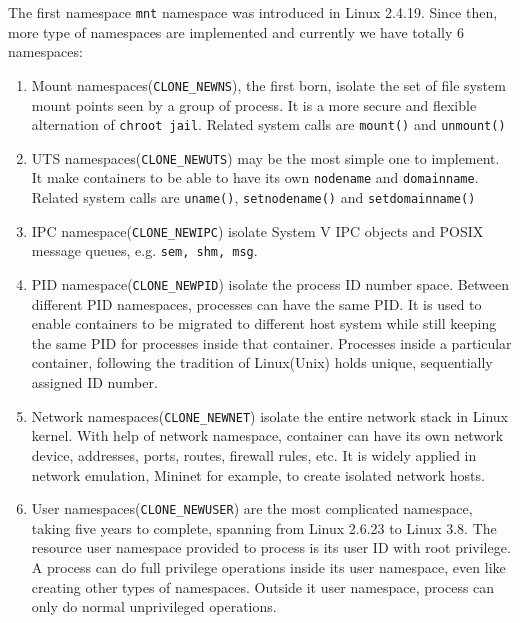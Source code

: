 \documentclass{acm_proc_article-sp}
\begin{document}
The first namespace \texttt{mnt} namespace was introduced in Linux 2.4.19. 
Since then, more type of namespaces are implemented and currently we have totally 6 namespaces:
\begin{enumerate}
\item Mount namespaces(\texttt{CLONE\_NEWNS}), the first born, isolate the set of file system mount points seen by a group of process\cite{lwn:namespace:overview}. It is a more secure and flexible alternation of \texttt{chroot jail}. Related system calls are \texttt{mount()} and \texttt{unmount()}

\item UTS namespaces(\texttt{CLONE\_NEWUTS}) may be the most simple one to implement. It make containers to be able to have its own \texttt{nodename} and \texttt{domainname}\cite{lwn:namespace:overview}. Related system calls are \texttt{uname()}, \texttt{setnodename()} and \texttt{setdomainname()} 

\item IPC namespace(\texttt{CLONE\_NEWIPC}) isolate System V IPC objects and POSIX message queues, e.g. \texttt{sem, shm, msg}. 

\item PID namespace(\texttt{CLONE\_NEWPID}) isolate the process ID number space. Between different PID namespaces, processes can have the same PID. 
It is used to enable containers to be migrated to different host system while still keeping the same PID for processes inside that container. 
Processes inside a particular container, following the tradition of Linux(Unix) holds unique, sequentially assigned ID number.\cite{lwn:namespace:pid}

\item Network namespaces(\texttt{CLONE\_NEWNET}) isolate the entire network stack in Linux kernel. With help of network namespace, container can have its own network device, addresses, ports, routes, firewall rules, etc\cite{lwn:namespace:net}. 
It is widely applied in network emulation, Mininet\cite{mininet} for example, to create isolated network hosts.

\item User namespaces(\texttt{CLONE\_NEWUSER}) are the most complicated namespace, taking five years to complete, spanning from Linux 2.6.23 to Linux 3.8\cite{lwn:namespace:user}. 
The resource user namespace provided to process is its user ID with root privilege. 
A process can do full privilege operations inside its user namespace, even like creating other types of namespaces. Outside it user namespace, process can only do normal unprivileged operations.
\end{enumerate}
\end{document}
